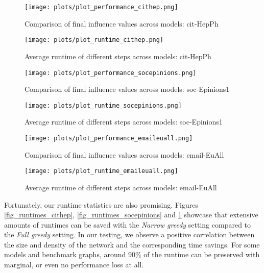 \documentclass[pdflatex,sn-mathphys-ay]{sn-jnl}
\begin{document}
\begin{figure}[p]
\centering
\begin{minipage}[b]{0.45\textwidth}
\texttt{[image: plots/plot\_performance\_cithep.png]}
\caption{Comparison of final influence values across models: cit-HepPh}
\label{fig_performance_cithep}
\end{minipage}
\hfill
\begin{minipage}[b]{0.45\textwidth}
\texttt{[image: plots/plot\_runtime\_cithep.png]}
\caption{Average runtime of different steps across models: cit-HepPh}
\label{fig_runtimes_cithep}
\end{minipage}
\vspace{5mm}
\centering
\begin{minipage}[b]{0.45\textwidth}
\texttt{[image: plots/plot\_performance\_socepinions.png]}
\caption{Comparison of final influence values across models: soc-Epinions1}
\label{fig_performance_socepinions}
\end{minipage}
\hfill
\begin{minipage}[b]{0.45\textwidth}
\texttt{[image: plots/plot\_runtime\_socepinions.png]}
\caption{Average runtime of different steps across models: soc-Epinions1}
\label{fig_runtimes_socepinions}
\end{minipage}
\vspace{5mm}
\centering
\begin{minipage}[b]{0.45\textwidth}
\texttt{[image: plots/plot\_performance\_emaileuall.png]}
\caption{Comparison of final influence values across models: email-EuAll}
\label{fig_performance_emaileuall}
\end{minipage}
\hfill
\begin{minipage}[b]{0.45\textwidth}
\texttt{[image: plots/plot\_runtime\_emaileuall.png]}
\caption{Average runtime of different steps across models: email-EuAll}
\label{fig_runtimes_emaileuall}
\end{minipage}
\end{figure}

Fortunately, our runtime statistics are also promising. Figures \ref{fig_runtimes_cithep}, \ref{fig_runtimes_socepinions} and \ref{fig_runtimes_emaileuall} showcase that extensive amounts of runtimes can be saved with the \textit{Narrow greedy} setting compared to the \textit{Full greedy} setting. In our testing, we observe a positive correlation between the size and density of the network and the corresponding time savings. For some models and benchmark graphs, around $90\%$ of the runtime can be preserved with marginal, or even no performance loss at all.
\end{document}
